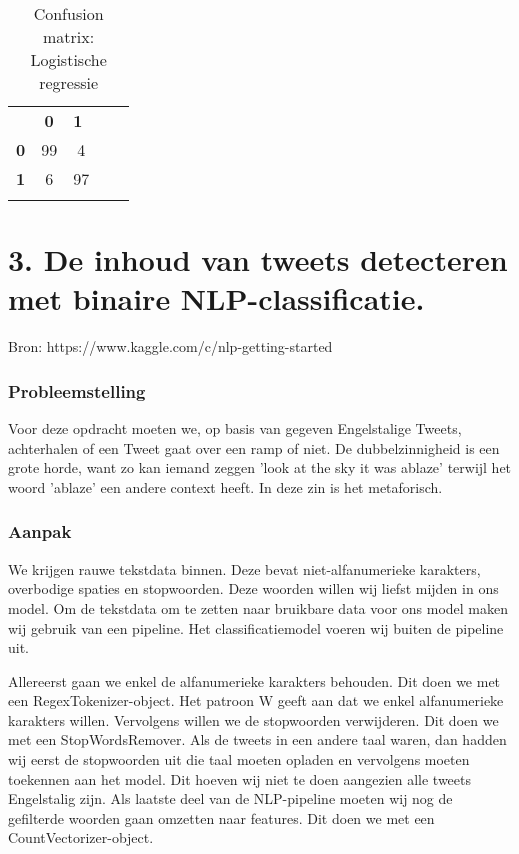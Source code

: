 \documentclass[a4paper,10pt,twoside]{report}
\begin{document}
\begin{table}[]
    \caption{Confusion matrix: Logistische regressie}
    \label{tab:my-table}
    \begin{tabular}{lclll}
    \multicolumn{1}{c}{\textbf{}}   & \textbf{0}              & \textbf{1}              &  &  \\ \cline{2-3}
    \multicolumn{1}{c|}{\textbf{0}} & \multicolumn{1}{c|}{99} & \multicolumn{1}{c|}{4}  &  &  \\ \cline{2-3}
    \multicolumn{1}{l|}{\textbf{1}} & \multicolumn{1}{c|}{6}  & \multicolumn{1}{c|}{97} &  &  \\ \cline{2-3}
                                    & \multicolumn{1}{l}{}    &                         &  & 
    \end{tabular}
\end{table}

\chapter*{3. De inhoud van tweets detecteren met binaire NLP-classificatie.}

Bron: https://www.kaggle.com/c/nlp-getting-started

\subsection*{Probleemstelling}

Voor deze opdracht moeten we, op basis van gegeven Engelstalige Tweets, achterhalen of een Tweet gaat over een ramp of niet. De dubbelzinnigheid is een grote horde, want zo kan iemand zeggen 'look at the sky it was ablaze' terwijl het woord 'ablaze' een andere context heeft. In deze zin is het metaforisch.

\subsection*{Aanpak}

We krijgen rauwe tekstdata binnen. Deze bevat niet-alfanumerieke karakters, overbodige spaties en stopwoorden. Deze woorden willen wij liefst mijden in ons model. Om de tekstdata om te zetten naar bruikbare data voor ons model maken wij gebruik van een pipeline. Het classificatiemodel voeren wij buiten de pipeline uit.

Allereerst gaan we enkel de alfanumerieke karakters behouden. Dit doen we met een RegexTokenizer-object. Het patroon W geeft aan dat we enkel alfanumerieke karakters willen. Vervolgens willen we de stopwoorden verwijderen. Dit doen we met een StopWordsRemover. Als de tweets in een andere taal waren, dan hadden wij eerst de stopwoorden uit die taal moeten opladen en vervolgens moeten toekennen aan het model. Dit hoeven wij niet te doen aangezien alle tweets Engelstalig zijn. Als laatste deel van de NLP-pipeline moeten wij nog de gefilterde woorden gaan omzetten naar features. Dit doen we met een CountVectorizer-object.
\end{document}
